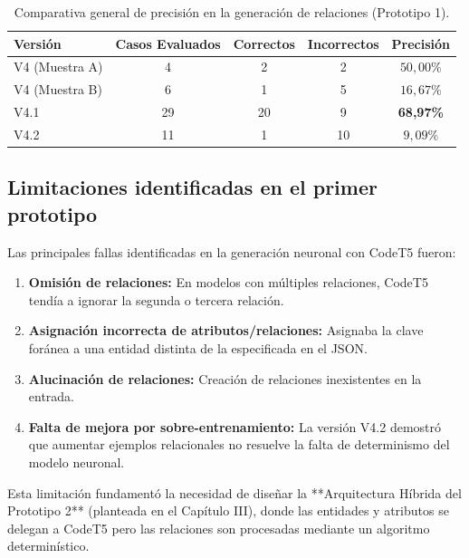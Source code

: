 \begin{table}[htbp]
\centering
\caption{Comparativa general de precisión en la generación de relaciones (Prototipo 1).}
\label{tab:comparativa-versiones}
\begin{tabular}{lcccc}
\hline
\textbf{Versión} & \textbf{Casos Evaluados} & \textbf{Correctos} & \textbf{Incorrectos} & \textbf{Precisión} \\ \hline
V4 (Muestra A)   & 4                        & 2                  & 2                    & $50{,}00\%$       \\
V4 (Muestra B)   & 6                        & 1                  & 5                    & $16{,}67\%$       \\
V4.1             & 29                       & 20                 & 9                    & \textbf{68,97\%}  \\
V4.2             & 11                       & 1                  & 10                   & $9{,}09\%$        \\ \hline
\end{tabular}
\end{table}

\subsection{Limitaciones identificadas en el primer prototipo}
\label{subsec:p1-limitaciones}

Las principales fallas identificadas en la generación neuronal con CodeT5 fueron:
\begin{enumerate}
    \item \textbf{Omisión de relaciones:} En modelos con múltiples relaciones, CodeT5 tendía a ignorar la segunda o tercera relación.
    \item \textbf{Asignación incorrecta de atributos/relaciones:} Asignaba la clave foránea a una entidad distinta de la especificada en el JSON.
    \item \textbf{Alucinación de relaciones:} Creación de relaciones inexistentes en la entrada.
    \item \textbf{Falta de mejora por sobre-entrenamiento:} La versión V4.2 demostró que aumentar ejemplos relacionales no resuelve la falta de determinismo del modelo neuronal.
\end{enumerate}

Esta limitación fundamentó la necesidad de diseñar la **Arquitectura Híbrida del Prototipo 2** (planteada en el Capítulo III), donde las entidades y atributos se delegan a CodeT5 pero las relaciones son procesadas mediante un algoritmo determinístico.